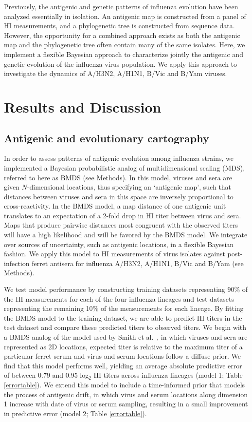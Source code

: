 \documentclass[11pt,oneside,letterpaper]{article}
\begin{document}
Previously, the antigenic and genetic patterns of influenza evolution have been analyzed essentially in isolation. 
An antigenic map is constructed from a panel of HI measurements, and a phylogenetic tree is constructed from sequence data. 
However, the opportunity for a combined approach exists as both the antigenic map and the phylogenetic tree often contain many of the same isolates. 
Here, we implement a flexible Bayesian approach to characterize jointly the antigenic and genetic evolution of the influenza virus population. 
We apply this approach to investigate the dynamics of A/H3N2, A/H1N1, B/Vic and B/Yam viruses. 

\section*{Results and Discussion}

\subsection*{Antigenic and evolutionary cartography}

In order to assess patterns of antigenic evolution among influenza strains, we implemented a Bayesian probabilistic analog of multidimensional scaling (MDS), referred to here as BMDS (see Methods).
In this model, viruses and sera are given $N$-dimensional locations, thus specifying an `antigenic map', such that distances between viruses and sera in this space are inversely proportional to cross-reactivity.
In the BMDS model, a map distance of one antigenic unit translates to an expectation of a 2-fold drop in HI titer between virus and sera.
Maps that produce pairwise distances most congruent with the observed titers will have a high likelihood and will be favored by the BMDS model.
We integrate over sources of uncertainty, such as antigenic locations, in a flexible Bayesian fashion.
We apply this model to HI measurements of virus isolates against post-infection ferret antisera for influenza A/H3N2, A/H1N1, B/Vic and B/Yam (see Methods).

We test model performance by constructing training datasets representing 90\% of the HI measurements for each of the four influenza lineages and test datasets representing the remaining 10\% of the measurements for each lineage. 
By fitting the BMDS model to the training dataset, we are able to predict HI titers in the test dataset and compare these predicted titers to observed titers. 
We begin with a BMDS analog of the model used by Smith et al.\ \cite{Smith04}, in which viruses and sera are represented as 2D locations, expected titer is relative to the maximum titer of a particular ferret serum and virus and serum locations follow a diffuse prior.
We find that this model performs well, yielding an average absolute predictive error of between 0.79 and 0.95 log$_2$ HI titers across influenza lineages (model 1; Table \ref{errortable}).
We extend this model to include a time-informed prior that models the process of antigenic drift, in which virus and serum locations  along dimension 1 increase with date of virus or serum sampling, resulting in a small improvement in predictive error (model 2; Table \ref{errortable}).
\end{document}
